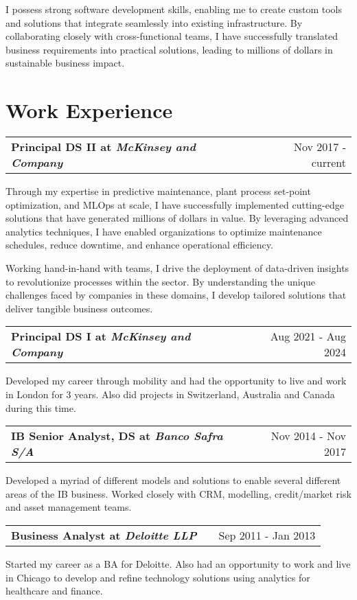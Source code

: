 \documentclass[a4paper,12pt]{article}
\makeatletter
\newenvironment{jobshort}[2]
    {
    \begin{tabularx}{\linewidth}{@{}l X r@{}}
    \textbf{#1} & \hfill &  #2 \\[3.75pt]
    \end{tabularx}
    }
    {
    }
\makeatother
\begin{document}
I possess strong software development skills, enabling me to create custom tools and solutions that integrate seamlessly into existing infrastructure. By collaborating closely with cross-functional teams, I have successfully translated business requirements into practical solutions, leading to millions of dollars in sustainable business impact.

\section{Work Experience}

\begin{jobshort}{Principal DS II at \textit{McKinsey and Company}}{Nov 2017 - current}
Through my expertise in predictive maintenance, plant process set-point optimization, and MLOps at scale,
I have successfully implemented cutting-edge solutions that have generated millions of dollars in value.
By leveraging advanced analytics techniques, I have enabled organizations to optimize maintenance schedules, reduce
downtime, and enhance operational efficiency.

Working hand-in-hand with teams, I drive the deployment of data-driven insights to revolutionize processes within the
sector. By understanding the unique challenges faced by companies in these domains, I develop tailored solutions that
deliver tangible business outcomes.
\end{jobshort}

\begin{jobshort}{Principal DS I at \textit{McKinsey and Company}}{Aug 2021 - Aug 2024}
Developed my career through mobility and had the opportunity to live and work in London for 3 years.
Also did projects in Switzerland, Australia and Canada during this time.
\end{jobshort}

\begin{jobshort}{IB Senior Analyst, DS at \textit{Banco Safra S/A}}{Nov 2014 - Nov 2017}
Developed a myriad of different models and solutions to enable several different areas of the
IB business. Worked closely with CRM, modelling, credit/market risk and asset management teams.
\end{jobshort}

\begin{jobshort}{Business Analyst at \textit{Deloitte LLP}}{Sep 2011 - Jan 2013}
Started my career as a BA for Deloitte. Also had an opportunity to work and live in Chicago to
develop and refine technology solutions using analytics for healthcare and finance.
\end{jobshort}
\end{document}
